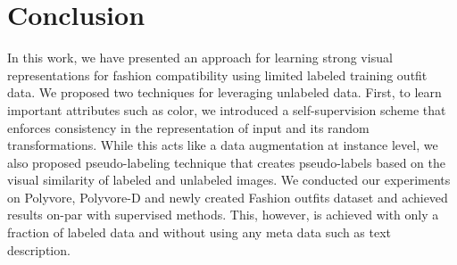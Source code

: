 \documentclass[sigconf]{acmart}
\begin{document}
\section{Conclusion}
In this work, we have presented an approach for learning strong visual representations for fashion compatibility using limited labeled training outfit data. We proposed two techniques for leveraging unlabeled data. First, to learn important attributes such as color, we introduced a self-supervision scheme that enforces consistency in the representation of input and its random transformations. While this acts like a data augmentation at instance level, we also proposed pseudo-labeling technique that creates pseudo-labels based on the visual similarity of labeled and unlabeled images. We conducted our experiments on Polyvore, Polyvore-D and newly created Fashion outfits dataset and achieved results on-par with supervised methods. This, however, is achieved with only a fraction of labeled data and without using any meta data such as text description. 


 
\end{document}
